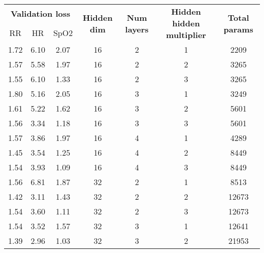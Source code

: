 \documentclass{article}
\begin{document}
 
\begin{table*}[t]
    \scriptsize
    \begin{center}
        \begin{tabular}{ccccccc}
        \toprule
        \multicolumn{3}{c}{\textbf{Validation loss}} & \multirow{2}{*}{\textbf{Hidden dim}} & \multirow{2}{*}{\textbf{Num layers}} & \multirow{2}{*}{\textbf{Hidden hidden multiplier}} & \multirow{2}{*}{\textbf{Total params}} \\
        \cmidrule(lr){1-3}
        RR & HR & SpO2 & & & & \\
        \midrule
        1.72 &      6.10 &      2.07 &         16 &                        2 &          1 &        2209 \\
        1.57 &      5.58 &      1.97 &         16 &                        2 &          2 &        3265 \\
        1.55 &      6.10 &      1.33 &         16 &                        2 &          3 &        3265 \\
        1.80 &      5.16 &      2.05 &         16 &                        3 &          1 &        3249 \\
        1.61 &      5.22 &      1.62 &         16 &                        3 &          2 &        5601 \\
        1.56 &      3.34 &      1.18 &         16 &                        3 &          3 &        5601 \\
        1.57 &      3.86 &      1.97 &         16 &                        4 &          1 &        4289 \\
        1.45 &      3.54 &      1.25 &         16 &                        4 &          2 &        8449 \\
        1.54 &      3.93 &      1.09 &         16 &                        4 &          3 &        8449 \\
        1.56 &      6.81 &      1.87 &         32 &                        2 &          1 &        8513 \\
        1.42 &      3.11 &      1.43 &         32 &                        2 &          2 &       12673 \\
        1.54 &      3.60 &      1.11 &         32 &                        2 &          3 &       12673 \\
        1.54 &      3.52 &      1.57 &         32 &                        3 &          1 &       12641 \\
        1.39 &      2.96 &      1.03 &         32 &                        3 &          2 &       21953 \\

\end{tabular}
\end{center}
\end{table*}
\end{document}

